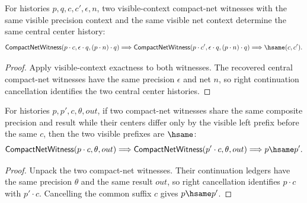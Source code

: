 \begin{theorem}
\label{thm:compact-net-witness-visible-context-center-deterministic}
For histories $p,q,c,c',\epsilon,n$, two visible-context compact-net witnesses
with the same visible precision context and the same visible net context
determine the same central center history:
$$
\mathsf{CompactNetWitness}(p\cdot c,\epsilon\cdot q,(p\cdot n)\cdot q)
\Longrightarrow
\mathsf{CompactNetWitness}(p\cdot c',\epsilon\cdot q,(p\cdot n)\cdot q)
\Longrightarrow
\hsame(c,c').
$$
\end{theorem}
\begin{proof}
Apply visible-context exactness to both witnesses. The recovered central
compact-net witnesses have the same precision $\epsilon$ and net $n$, so right
continuation cancellation identifies the two central center histories.
\end{proof}

\begin{theorem}
\label{thm:compact-net-witness-common-composite-result-prefix-deterministic}
For histories $p,p',c,\theta,out$, if two compact-net witnesses share the same
composite precision and result while their centers differ only by the visible
left prefix before the same $c$, then the two visible prefixes are $\hsame$:
$$
\mathsf{CompactNetWitness}(p\cdot c,\theta,out)
\Longrightarrow
\mathsf{CompactNetWitness}(p'\cdot c,\theta,out)
\Longrightarrow
p\hsame p'.
$$
\end{theorem}
\begin{proof}
Unpack the two compact-net witnesses. Their continuation ledgers have the same
precision $\theta$ and the same result $out$, so right cancellation identifies
$p\cdot c$ with $p'\cdot c$. Cancelling the common suffix $c$ gives
$p\hsame p'$.
\end{proof}

